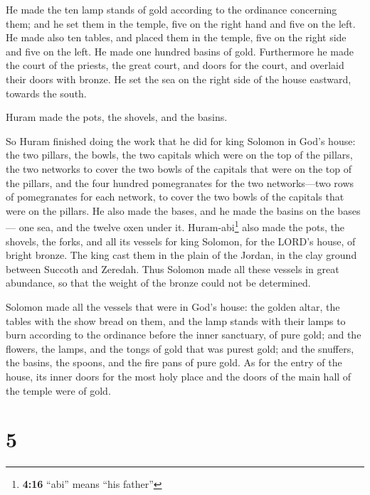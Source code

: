  He made the ten lamp stands of gold according to the
ordinance concerning them; and he set them in the temple, five on the
right hand and five on the left.  He made also ten tables,
and placed them in the temple, five on the right side and five on the
left. He made one hundred basins of gold.  Furthermore he
made the court of the priests, the great court, and doors for the court,
and overlaid their doors with bronze.  He set the sea on
the right side of the house eastward, towards the south.

 Huram made the pots, the shovels, and the basins.

So Huram finished doing the work that he did for king Solomon in God's
house:  the two pillars, the bowls, the two capitals
which were on the top of the pillars, the two networks to cover the two
bowls of the capitals that were on the top of the pillars,
 and the four hundred pomegranates for the two
networks---two rows of pomegranates for each network, to cover the two
bowls of the capitals that were on the pillars.  He also
made the bases, and he made the basins on the bases--- 
one sea, and the twelve oxen under it. 
Huram-abi\footnote{\textbf{4:16} ``abi'' means ``his father''} also made
the pots, the shovels, the forks, and all its vessels for king Solomon,
for the LORD's house, of bright bronze.  The king cast
them in the plain of the Jordan, in the clay ground between Succoth and
Zeredah.  Thus Solomon made all these vessels in great
abundance, so that the weight of the bronze could not be determined.

 Solomon made all the vessels that were in God's house:
the golden altar, the tables with the show bread on them,
 and the lamp stands with their lamps to burn according
to the ordinance before the inner sanctuary, of pure gold;
 and the flowers, the lamps, and the tongs of gold that
was purest gold;  and the snuffers, the basins, the
spoons, and the fire pans of pure gold. As for the entry of the house,
its inner doors for the most holy place and the doors of the main hall
of the temple were of gold.

\hypertarget{section-4}{%
\section{5}\label{section-4}}


